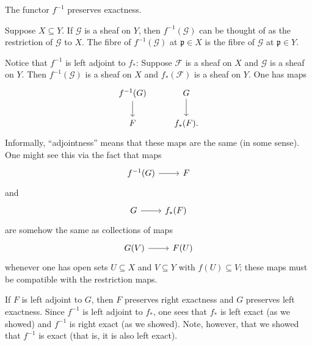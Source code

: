 \documentclass [11 pt, oneside] {article}
\begin{document}
\begin{remark}
	The functor $f^{-1}$ preserves exactness.
\end{remark}

\begin{example}[ ]\label{}\text{}
Suppose $X\subseteq Y$. If $\mathscr{G}$ is a sheaf on $Y$, then $f^{-1}(\mathscr{G})$ can be thought of as the restriction of $\mathscr{G}$ to $X$. The fibre of $f^{-1}(\mathscr{G})$ at $\mathfrak p\in X$ is the fibre of $\mathscr{G}$ at $\mathfrak p\in Y$.
\end{example}

Notice that $f^{-1}$ is left adjoint to $f_*$: Suppose $\mathscr{F}$ is a sheaf on $X$ and $\mathscr{G}$ is a sheaf on $Y$. Then $f^{-1}(\mathscr{G})$ is a sheaf on $X$ and $f_*(\mathscr{F})$ is a sheaf on $Y$. One has maps
\[
\begin{tikzcd}
	f^{-1}(\mathscr{G}) \ar[d]& \mathscr{G}\ar[d]\\
	\mathscr{F} & f_*(\mathscr{F}).
\end{tikzcd}
\]
Informally, ``adjointness'' means that these maps are the same (in some sense). One might see this via the fact that maps
\[
\begin{tikzcd}
f^{-1}(\mathscr{G})\ar[r]& \mathscr{F}
\end{tikzcd}
\]
and
\[
\begin{tikzcd}
\mathscr{G}\ar[r]& f_*(\mathscr{F})
\end{tikzcd}
\]
are somehow the same as collections of maps 
\[
\begin{tikzcd}
\mathscr{G}(V) \ar[r]& \mathscr{F}(U)
\end{tikzcd}
\]
whenever one has open sets $U\subseteq X$ and $V\subseteq Y$ with $f(U)\subseteq V$; these maps must be compatible with the restriction maps.

If $F$ is left adjoint to $G$, then $F$ preserves right exactness and $G$ preserves left exactness. Since $f^{-1}$ is left adjoint to $f_*$, one sees that $f_*$ is left exact (as we showed) and $f^{-1}$ is right exact (as we showed). Note, however, that we showed that $f^{-1}$ is exact (that is, it is also left exact).
\end{document}
